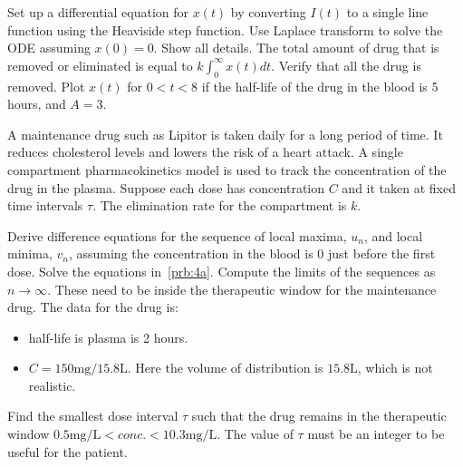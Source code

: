\documentclass[
	number={4},
	title={Pharmacokinetics}
]{math486homework}
\begin{document}
\begin{problems}
\begin{problems}
		\subproblem Set up a differential equation for $x(t)$ by converting $I(t)$ to a single line function using the Heaviside step function. 
		\subproblem Use Laplace transform to solve the ODE assuming $x(0) = 0$.
		Show all details.
		\subproblem The total amount of drug that is removed or eliminated is equal to $k \int_{0}^{\infty} x(t)dt $.
		Verify that all the drug is removed. 
		\subproblem Plot $x(t)$ for $0 < t < 8$ if the half-life of the drug in the blood is 5 hours, and $A=3$. 
	\end{problems}
	\problem A maintenance drug such as Lipitor is taken daily for a long period of time.
	It reduces cholesterol levels and lowers the risk of a heart attack.
	A single compartment pharmacokinetics model is used to track the concentration of the drug in the plasma.
	Suppose each dose has concentration $C$ and it taken at fixed time intervals $\tau$.
	The elimination rate for the compartment is $k$.
	\begin{problems}
		\subproblem Derive difference equations for the sequence of local maxima, $u_{n}$, and local minima, $v_{n}$, assuming the concentration in the blood is 0 just before the first dose. 
		\subproblem Solve the equations in~\ref{prb:4a}.
		Compute the limits of the sequences as $n\rightarrow\infty$.
		These need to be inside the therapeutic window for the maintenance drug. 
		\subproblem The data for the drug is:
		\begin{itemize}
			\item half-life is plasma is 2 hours.
			\item $C = 150 \mbox{mg} / 15.8 \mbox{L}$.
			Here the volume of distribution is $15.8\mbox{L}$, which is not realistic.
		\end{itemize}
		Find the smallest dose interval $\tau$ such that the drug remains in the therapeutic window  $0.5 \mbox{mg} / \mbox{L} < conc. < 10.3 \mbox{mg} / \mbox{L}$.
		The value of $\tau$ must be an integer to be useful for the patient.
	\end{problems}
\end{problems}
\end{document}
